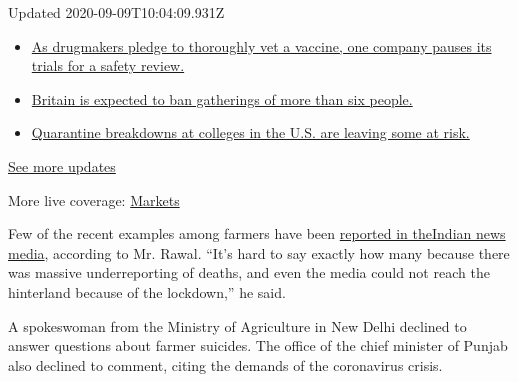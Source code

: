 Updated 2020-09-09T10:04:09.931Z

\begin{itemize}
\tightlist
\item
  \href{https://www.nytimes3xbfgragh.onion/2020/09/09/world/covid-19-coronavirus.html?action=click\&pgtype=Article\&state=default\&region=MAIN_CONTENT_1\&context=storylines_live_updates\#link-70cea8bb}{As
  drugmakers pledge to thoroughly vet a vaccine, one company pauses its
  trials for a safety review.}
\item
  \href{https://www.nytimes3xbfgragh.onion/2020/09/09/world/covid-19-coronavirus.html?action=click\&pgtype=Article\&state=default\&region=MAIN_CONTENT_1\&context=storylines_live_updates\#link-780eaa2f}{Britain
  is expected to ban gatherings of more than six people.}
\item
  \href{https://www.nytimes3xbfgragh.onion/2020/09/09/world/covid-19-coronavirus.html?action=click\&pgtype=Article\&state=default\&region=MAIN_CONTENT_1\&context=storylines_live_updates\#link-11cec4c0}{Quarantine
  breakdowns at colleges in the U.S. are leaving some at risk.}
\end{itemize}

\href{https://www.nytimes3xbfgragh.onion/2020/09/09/world/covid-19-coronavirus.html?action=click\&pgtype=Article\&state=default\&region=MAIN_CONTENT_1\&context=storylines_live_updates}{See
more updates}

More live coverage:
\href{https://www.nytimes3xbfgragh.onion/live/2020/09/08/business/stock-market-today-coronavirus?action=click\&pgtype=Article\&state=default\&region=MAIN_CONTENT_1\&context=storylines_live_updates}{Markets}

Few of the recent examples among farmers have been
\href{https://www.indiatoday.in/india/story/maharashtra-s-amravati-division-records-206-farmer-suicides-in-march-may-1703036-2020-07-22}{reported
in
the}\href{https://timesofindia.indiatimes.com/city/mumbai/1074-farmers-ended-lives-in-maharashtra-in-6-months/articleshow/77404297.cms}{Indian
news media}, according to Mr. Rawal. ``It's hard to say exactly how many
because there was massive underreporting of deaths, and even the media
could not reach the hinterland because of the lockdown,'' he said.

A spokeswoman from the Ministry of Agriculture in New Delhi declined to
answer questions about farmer suicides. The office of the chief minister
of Punjab also declined to comment, citing the demands of the
coronavirus crisis.

